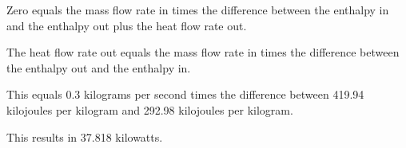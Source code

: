 Zero equals the mass flow rate in times the difference between the enthalpy in and the enthalpy out plus the heat flow rate out.

The heat flow rate out equals the mass flow rate in times the difference between the enthalpy out and the enthalpy in.

This equals 0.3 kilograms per second times the difference between 419.94 kilojoules per kilogram and 292.98 kilojoules per kilogram.

This results in 37.818 kilowatts.